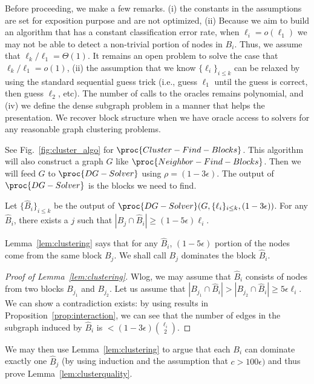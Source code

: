Before proceeding, we make a few remarks. (i) the constants in the assumptions are set for exposition purpose and are not optimized, (ii) Because we aim to build an algorithm that has a constant classification error rate, when $\ell_i = o(\ell_1)$ we may not be able to detect a non-trivial portion of nodes in $B_i$. Thus, we assume that $\ell_k / \ell_1 = \Theta(1)$. It remains an open problem to solve the case that $\ell_k/\ell_1 = o(1)$, (ii) the assumption that we know $\{\ell_i\}_{i \leq k}$ can be relaxed by using the standard sequential guess trick (i.e., guess $\ell_1$ until the guess is correct, then guess $\ell_2$, etc). The number of calls to the oracles remains polynomial, and (iv) we define the dense subgraph problem in a manner that helps the presentation. We recover block structure when we have oracle access to solvers for any reasonable graph clustering problems. 


 See Fig.~\ref{fig:cluster_algo} for $\proc{Cluster-Find-Blocks}$. This algorithm will also construct a graph $G$ like $\proc{Neighbor-Find-Blocks}$. Then we will feed $G$ to $\proc{DG-Solver}$ using $\rho = (1-3 \epsilon)$. The output of $\proc{DG-Solver}$ is the blocks we need to find. 


\begin{lemma}\label{lem:clustering} Let $\{\hat B_i\}_{i \leq k}$ be the output of $\proc{DG-Solver}(G, \{\ell_i\}_{i \leq k}, (1-3\epsilon))$. For any $\hat B_i$, there exists a $j$ such that $|B_j \cap \hat B_i| \geq (1-5\epsilon) \ell_i$. 
\end{lemma}

Lemma~\ref{lem:clustering} says that for any $\hat B_i$, $(1-5\epsilon)$ portion of the nodes come from the same block $B_j$. We shall call $B_j$ dominates the block $\hat B_i$. 

\begin{proof}[Proof of Lemma~\ref{lem:clustering}] Wlog, we may assume that $\hat B_i$ consists of nodes from two blocks $B_{j_1}$ and $B_{j_2}$. Let us assume that $|B_{j_1} \cap \hat B_i| > |B_{j_2} \cap \hat B_i| \geq 5 \epsilon \ell_i$. We can show a contradiction exists: by using results in Proposition~\ref{prop:interaction}, we can see that the number of edges in the subgraph induced by $\hat B_i$ is $< (1-3\epsilon)\binom{\ell_i}{2}$. 
\end{proof}

We may then use Lemma~\ref{lem:clustering} to argue that each $B_i$ can dominate exactly one $\hat B_j$ (by using induction and the assumption that $c > 100 \epsilon)$ and thus prove Lemma~\ref{lem:clusterquality}.

